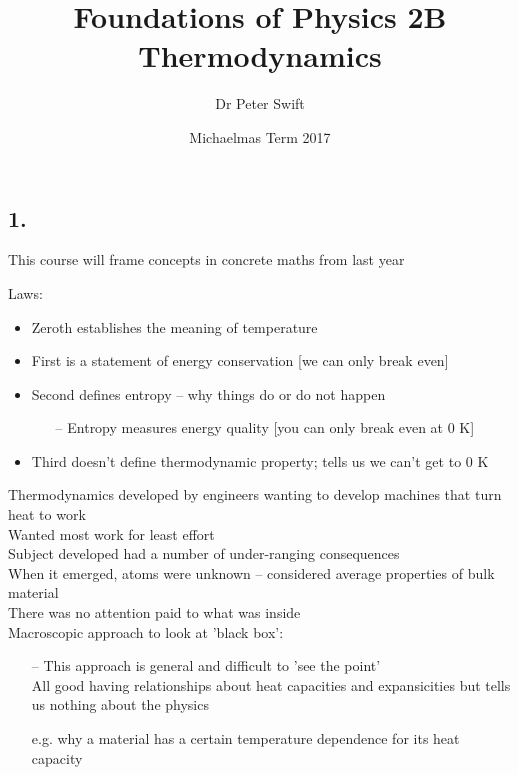 \documentclass[a4paper, 11pt, fleqn, normalem]{report}
\title{Foundations of Physics 2B \\ Thermodynamics \vspace{-20pt}}
\author{Dr Peter Swift}
\date{\vspace{-15pt}Michaelmas Term 2017}
\begin{document}
\maketitle
\thispagestyle{fancy}

\tableofcontents

\chapter{}
\section{1.}
This course will frame concepts in concrete maths from last year

Laws:
\begin{itemize}
  \item Zeroth establishes the meaning of temperature
  \item First is a statement of energy conservation [we can only break even]
  \item Second defines entropy -- why things do or do not happen
  \begin{itemize}
    \item[--] Entropy measures energy quality [you can only break even at 0 K]
  \end{itemize}
  \item Third doesn't define thermodynamic property; tells us we can't get to 0 K
\end{itemize}

Thermodynamics developed by engineers wanting to develop machines that turn heat to work \\
Wanted most work for least effort \\
Subject developed had a number of under-ranging consequences \\
When it emerged, atoms were unknown -- considered average properties of bulk material \\
There was no attention paid to what was inside \\
Macroscopic approach to look at 'black box':
\begin{itemize}
  \item[--] This approach is general and difficult to 'see the point' \\
  All good having relationships about heat capacities and expansicities but tells us nothing about the physics
  \item[e.g.] why a material has a certain temperature dependence for its heat capacity
\end{itemize}
\end{document}
